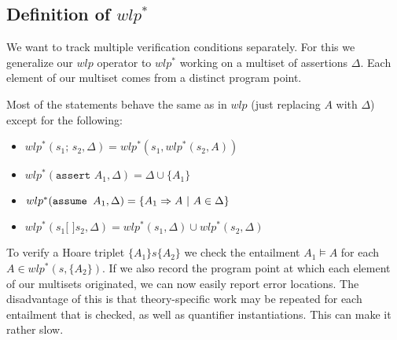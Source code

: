 \subsection{Definition of $wlp^*$}
\begin{mytitle} We want to track multiple verification conditions separately. For this we generalize our $wlp$ operator to $wlp^*$ working on a multiset of assertions $\Delta$. Each element of our multiset comes from a distinct program point.
\end{mytitle}
\begin{mytitle} Most of the statements behave the same as in $wlp$ (just replacing $A$ with $\Delta$) except for the following:
\begin{itemize}
    \item $wlp^*(\texttt{$s_1$; $s_2$}, \Delta) = wlp^*(s_1, wlp^*(s_2, A))$
    \item $wlp^*(\texttt{assert $A_1$}, \Delta) = \Delta\cup\{A_1\}$
    \item $wlp^*(\texttt{assume $A_1$}, \Delta) = \{A_1 \Rightarrow A\ |\ A \in \Delta\}$
    \item $wlp^*(\texttt{$s_1$[ ]$s_2$}, \Delta) = wlp^*(s_1, \Delta) \cup wlp^*(s_2, \Delta)$
\end{itemize}
To verify a Hoare triplet $\{A_1\}s\{A_2\}$ we check the entailment $A_1\models A$ for each $A\in wlp^*(s, \{A_2\})$. If we also record the program point at which each element of our multisets originated, we can now easily report error locations. The disadvantage of this is that theory-specific work may be repeated for each entailment that is checked, as well as quantifier instantiations. This can make it rather slow.
\end{mytitle}